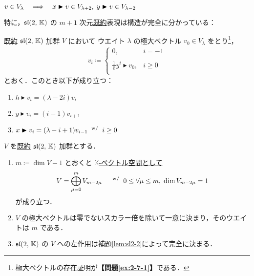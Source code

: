 \documentclass{ltjsarticle}
\theoremstyle{mystyle} %
\numberwithin{equation}{section}
\newcommand{\probref}[1]{\textbf{【問題\ref{#1}】}}
\newcommand{\btr}{\blacktriangleright}
\begin{document}
\begin{mylem}[label=lem:sl2-1]{}
	$v \in V_\lambda \IMP x \btr v \in V_{\lambda +2},\; y \btr v \in V_{\lambda - 2}$
\end{mylem}

特に，$\mathfrak{sl}(2,\, \mathbb{K})$ の $m+1$ 次元\underline{既約}表現は構造が完全に分かっている：

\begin{mylem}[label=lem:sl2-2]{}
    \underline{既約} $\mathfrak{sl}(2,\, \mathbb{K})$ 加群 $V$ において
    ウエイト $\lambda$ の極大ベクトル $v_0 \in V_\lambda$ をとり\footnote{極大ベクトルの存在証明が\probref{ex:2-7-1}である．}，
    \begin{align}
        v_i \coloneqq 
        \begin{cases}
            0, & i = -1 \\
            & \\
            \displaystyle \frac{1}{i!} y^i \btr v_0, & i \ge 0 \\
        \end{cases}
    \end{align}
    とおく．このとき以下が成り立つ：
	\begin{enumerate}
		\item $h \btr v_i = (\lambda - 2i) v_i$
		\item $y \btr v_i = (i+1) v_{i+1}$
		\item $x \btr v_i = (\lambda - i+1) v_{i-1}\WHERE i \ge 0$
	\end{enumerate}
\end{mylem}

\begin{mytheo}[label=thm:irr-sl2,breakable]{}
	$V$ を\underline{既約} $\mathfrak{sl}(2,\, \mathbb{K})$ 加群とする．
	\begin{enumerate}
		\item $m \coloneqq \dim V - 1$ とおくと \underline{$\mathbb{K}$-ベクトル空間として}
		\begin{align}
			V = \bigoplus_{\mu = 0}^m V_{m-2\mu}\quad \mathrel{} {}^{\mathrm{w}/} \mathrel{} 0 \le \forall \mu \le m,\; \dim V_{m - 2\mu} = 1
		\end{align}
		が成り立つ．
		\item $V$ の極大ベクトルは零でないスカラー倍を除いて一意に決まり，そのウエイトは $m$ である．
		\item $\mathfrak{sl}(2,\, \mathbb{K})$ の $V$ への左作用は補題\ref{lem:sl2-2}によって完全に決まる．
	\end{enumerate}
\end{mytheo}
\end{document}
